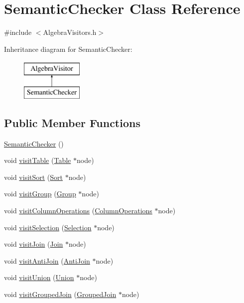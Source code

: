 \hypertarget{class_semantic_checker}{\section{Semantic\+Checker Class Reference}
\label{class_semantic_checker}
}


{\ttfamily \#include $<$Algebra\+Visitors.\+h$>$}

Inheritance diagram for Semantic\+Checker\+:\begin{figure}[H]
\begin{center}
\leavevmode
\includegraphics[height=2.000000cm]{class_semantic_checker}
\end{center}
\end{figure}
\subsection*{Public Member Functions}
\begin{DoxyCompactItemize}
\item 
\hyperlink{class_semantic_checker_a35a20bf073bd1fdf1de937db47b9f4c0}{Semantic\+Checker} ()
\item 
void \hyperlink{class_semantic_checker_a915d3f58ab60a0e6ba6f248e3c81f0c5}{visit\+Table} (\hyperlink{class_table}{Table} $\ast$node)
\item 
void \hyperlink{class_semantic_checker_ae7cbd8a1c92f544a282de4b741d1e19e}{visit\+Sort} (\hyperlink{class_sort}{Sort} $\ast$node)
\item 
void \hyperlink{class_semantic_checker_a8dfc703b185f05a0f57749e1eb3c0a56}{visit\+Group} (\hyperlink{class_group}{Group} $\ast$node)
\item 
void \hyperlink{class_semantic_checker_a5bd2ca32010822a95a6ef0a78190fc91}{visit\+Column\+Operations} (\hyperlink{class_column_operations}{Column\+Operations} $\ast$node)
\item 
void \hyperlink{class_semantic_checker_ac2825bf63bbda696b461166f915bacfe}{visit\+Selection} (\hyperlink{class_selection}{Selection} $\ast$node)
\item 
void \hyperlink{class_semantic_checker_a047de398ed6fab98a4ec6c1db533a66e}{visit\+Join} (\hyperlink{class_join}{Join} $\ast$node)
\item 
void \hyperlink{class_semantic_checker_aed141e3f22e681c74355fb3b84deb2d4}{visit\+Anti\+Join} (\hyperlink{class_anti_join}{Anti\+Join} $\ast$node)
\item 
void \hyperlink{class_semantic_checker_a120a86891155bd0296b9f3e878462bc6}{visit\+Union} (\hyperlink{class_union}{Union} $\ast$node)
\item 
void \hyperlink{class_semantic_checker_a44c4c5cf8cde9785a2a11f446d8fb90a}{visit\+Grouped\+Join} (\hyperlink{class_grouped_join}{Grouped\+Join} $\ast$node)
\end{DoxyCompactItemize}
